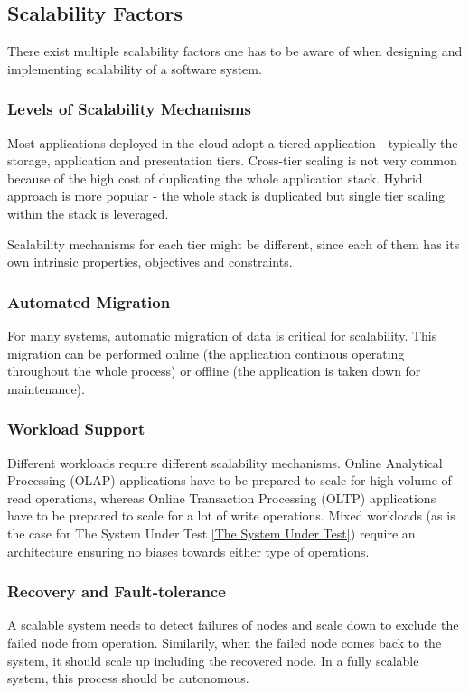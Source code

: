 \documentclass{uvamscse}
\begin{document}
\subsection{Scalability Factors}
There exist multiple scalability factors one has to be aware of when designing and implementing scalability of a software system\cite{WeiTek}.

\subsubsection{Levels of Scalability Mechanisms}
Most applications deployed in the cloud adopt a tiered application - typically the storage, application and presentation tiers. Cross-tier scaling is not very common because of the high cost of duplicating the whole application stack. Hybrid approach is more popular - the whole stack is duplicated but single tier scaling within the stack is leveraged.

Scalability mechanisms for each tier might be different, since each of them has its own intrinsic properties, objectives and constraints.

\subsubsection{Automated Migration}
For many systems, automatic migration of data is critical for scalability. This migration can be performed online (the application continous operating throughout the whole process) or offline (the application is taken down for maintenance).

\subsubsection{Workload Support}
Different workloads require different scalability mechanisms. Online Analytical Processing (OLAP) applications have to be prepared to scale for high volume of read operations, whereas Online Transaction Processing (OLTP) applications have to be prepared to scale for a lot of write operations. Mixed workloads (as is the case for The System Under Test \ref{The System Under Test}) require an architecture ensuring no biases towards either type of operations.

\subsubsection{Recovery and Fault-tolerance}
A scalable system needs to detect failures of nodes and scale down to exclude the failed node from operation. Similarily, when the failed node comes back to the system, it should scale up including the recovered node. In a fully scalable system, this process should be autonomous.
\end{document}
